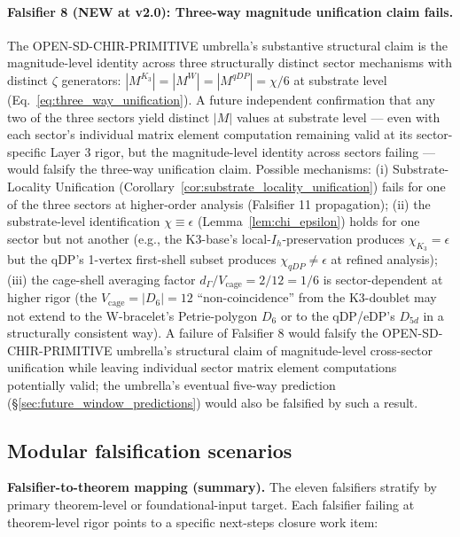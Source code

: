 \documentclass[11pt,letterpaper]{article}
\newcommand{\Kthree}{\ensuremath{K_3}}
\newcommand{\Dsix}{D_6}
\begin{document}
\paragraph{Falsifier 8 (NEW at v2.0): Three-way magnitude unification claim fails.}
The OPEN-SD-CHIR-PRIMITIVE umbrella's substantive structural claim is the magnitude-level identity across three structurally distinct sector mechanisms with distinct $\zeta$ generators: $|M^{\Kthree}| = |M^W| = |M^{qDP}| = \chi/6$ at substrate level (Eq.~\eqref{eq:three_way_unification}). A future independent confirmation that any two of the three sectors yield distinct $|M|$ values at substrate level --- even with each sector's individual matrix element computation remaining valid at its sector-specific Layer 3 rigor, but the magnitude-level identity across sectors failing --- would falsify the three-way unification claim. Possible mechanisms: (i) Substrate-Locality Unification (Corollary~\ref{cor:substrate_locality_unification}) fails for one of the three sectors at higher-order analysis (Falsifier 11 propagation); (ii) the substrate-level identification $\chi \equiv \epsilon$ (Lemma~\ref{lem:chi_epsilon}) holds for one sector but not another (e.g., the K3-base's local-$I_h$-preservation produces $\chi_{\Kthree} = \epsilon$ but the qDP's 1-vertex first-shell subset produces $\chi_{qDP} \neq \epsilon$ at refined analysis); (iii) the cage-shell averaging factor $d_\Gamma/V_{\text{cage}} = 2/12 = 1/6$ is sector-dependent at higher rigor (the $V_{\text{cage}} = |\Dsix| = 12$ ``non-coincidence'' from the K3-doublet may not extend to the W-bracelet's Petrie-polygon $\Dsix$ or to the qDP/eDP's $D_{5d}$ in a structurally consistent way). A failure of Falsifier 8 would falsify the OPEN-SD-CHIR-PRIMITIVE umbrella's structural claim of magnitude-level cross-sector unification while leaving individual sector matrix element computations potentially valid; the umbrella's eventual five-way prediction (\S\ref{sec:future_window_predictions}) would also be falsified by such a result.

\subsection{Modular falsification scenarios}\label{sec:falsifier_modular}

\textbf{Falsifier-to-theorem mapping (summary).} The eleven falsifiers stratify by primary theorem-level or foundational-input target. Each falsifier failing at theorem-level rigor points to a specific next-steps closure work item:
\end{document}
